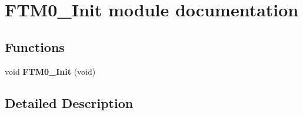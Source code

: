\hypertarget{group___f_t_m0___init__module}{}\section{F\+T\+M0\+\_\+\+Init module documentation}
\label{group___f_t_m0___init__module}
\subsection*{Functions}
\begin{DoxyCompactItemize}
\item 
void {\bfseries F\+T\+M0\+\_\+\+Init} (void)\hypertarget{group___f_t_m0___init__module_ga6632b187f983aa3168b2cdadb9419e5c}{}\label{group___f_t_m0___init__module_ga6632b187f983aa3168b2cdadb9419e5c}

\end{DoxyCompactItemize}


\subsection{Detailed Description}
